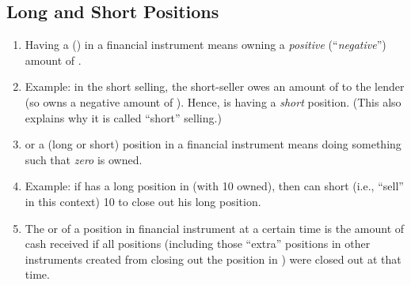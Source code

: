 \subsection{Long and Short Positions}
\label{subsect:long-short-pos}
\begin{enumerate}
\item Having a  () in a financial
instrument  means owning a \emph{positive} (``\emph{negative}'')
amount of .


\item Example: in the short selling, the short-seller  owes an amount of
 to the lender  (so  owns a
negative amount of ). Hence,  is having a
\emph{short} position.  (This also explains why it is called ``short''
selling.)

\item {} or  a (long or short) position in a
financial instrument  means doing something such that
\emph{zero}  is owned.

\item Example: if  has a long position in  (with 10
 owned), then  can short (i.e., ``sell'' in this
context) 10  to close out his long position.

\item The  or  of a position in financial instrument
 at a certain time is the amount of cash 
received if all positions (including those ``extra'' positions in other
instruments created from closing out the position in ) were
closed out at that time.

\end{enumerate}
